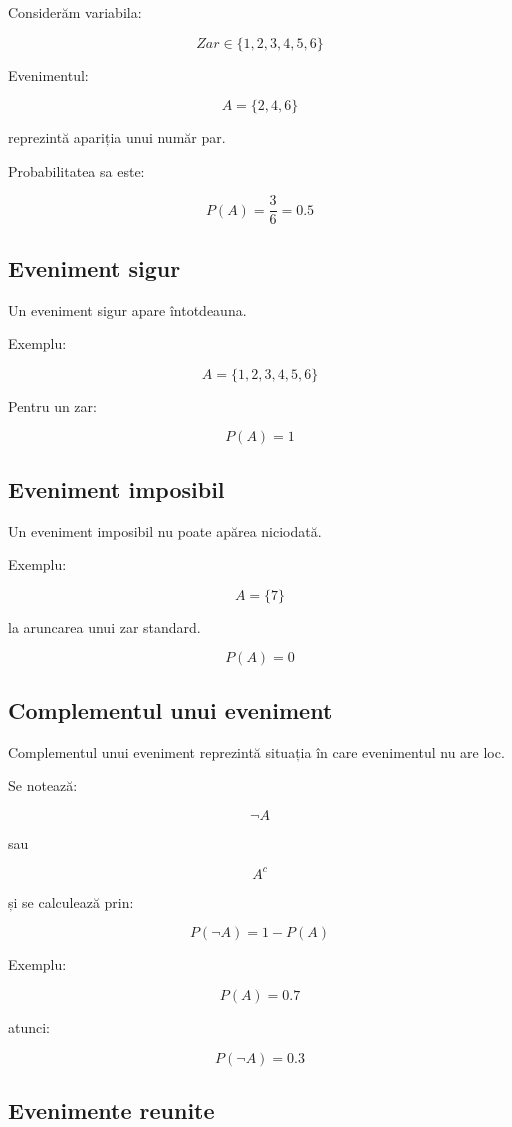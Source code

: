 \documentclass[12pt,a4paper]{article}
\begin{document}
Considerăm variabila:

\[
Zar \in \{1,2,3,4,5,6\}
\]

Evenimentul:

\[
A = \{2,4,6\}
\]

reprezintă apariția unui număr par.

Probabilitatea sa este:

\[
P(A)=\frac{3}{6}=0.5
\]

\subsection{Eveniment sigur}

Un eveniment sigur apare întotdeauna.

Exemplu:

\[
A=\{1,2,3,4,5,6\}
\]

Pentru un zar:

\[
P(A)=1
\]

\subsection{Eveniment imposibil}

Un eveniment imposibil nu poate apărea niciodată.

Exemplu:

\[
A=\{7\}
\]

la aruncarea unui zar standard.

\[
P(A)=0
\]

\subsection{Complementul unui eveniment}

Complementul unui eveniment reprezintă situația în care evenimentul nu are loc.

Se notează:

\[
\neg A
\]

sau

\[
A^c
\]

și se calculează prin:

\[
P(\neg A)=1-P(A)
\]

Exemplu:

\[
P(A)=0.7
\]

atunci:

\[
P(\neg A)=0.3
\]

\subsection{Evenimente reunite}
\end{document}
